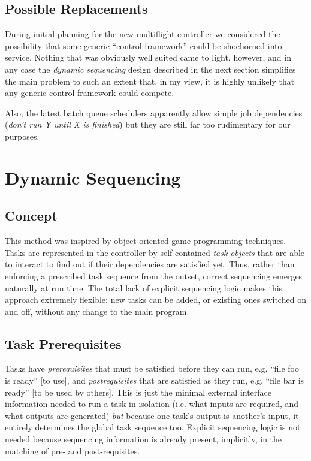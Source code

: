 \documentclass[11pt,a4paper]{report}
\begin{document}
\section{Possible Replacements}

During initial planning for the new multiflight controller we considered
the possibility that some generic ``control framework'' could be
shoehorned into service. Nothing that was obviously well suited came to
light, however, and in any case the {\em dynamic sequencing} design
described in the next section simplifies the main problem to such an
extent that, in my view, it is highly unlikely that any generic
control framework could compete.  

Also, the latest batch queue schedulers apparently allow simple job
dependencies ({\em don't run Y until X is finished}) but they are still
far too rudimentary for our purposes.  


\chapter{Dynamic Sequencing}

\section{Concept}

This method was inspired by object oriented game programming techniques.
Tasks are represented in the controller by self-contained {\em task
objects} that are able to interact to find out if their dependencies are
satisfied yet. Thus, rather than enforcing a prescribed task sequence
from the outset, correct sequencing emerges naturally at run time. The
total lack of explicit sequencing logic makes this approach extremely
flexible: new tasks can be added, or existing ones switched on and off,
without any change to the main program.


\section{Task Prerequisites}

Tasks have {\em prerequisites} that must be satisfied before they can
run, e.g. ``file foo is ready'' [to use], and {\em postrequisites} that
are satisfied as they run, e.g. ``file bar is ready'' [to be used by
others]. This is just the minimal external interface information needed
to run a task in isolation (i.e. what inputs are required, and what
outputs are generated) {\em but} because one task's output is another's
input, it entirely determines the global task sequence too. Explicit
sequencing logic is not needed because sequencing information is already
present, implicitly, in the matching of pre- and post-requisites. 
\end{document}
